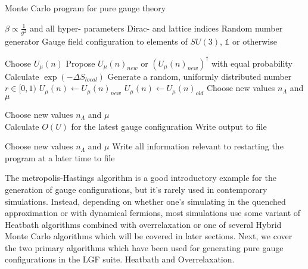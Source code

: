 \documentclass[a4paper,10pt]{book}
\begin{document}
\begin{algorithm}
\caption{Monte Carlo program for pure gauge theory}\label{alg:cap}
\begin{algorithmic}

\Ensure 
\State $\beta \propto \frac{1}{g^2}$ and all hyper- parameters
\State Dirac- and lattice indices
\State Random number generator 
\State Gauge field configuration to elements of $SU(3)$, $\mathbb{1}$ or otherwise

\State Choose $U_\mu(n)$
\State Propose $U_\mu(n)_{new}$ or $(U_\mu(n)_{new})^\dagger$ with equal probability
\State Calculate $\exp (-\Delta S_{local})$
\State Generate a random, uniformly distributed number $r \in [0,1) $
    \State $U_\mu(n) \gets U_\mu(n)_{new}$
\Else
    \State $U_\mu(n) \gets U_\mu(n)_{old}$
\EndIf
\EndFunction
\State Choose new values $n_\Lambda$ and $\mu$
\EndWhile



\State Choose new values $n_\Lambda$ and $\mu$
\EndFunction
\EndWhile\\

\State Calculate $O(U)$ for the latest gauge configuration
\State Write output to file 

\EndFunction
\State Choose new values $n_\Lambda$ and $\mu$
\EndWhile
\State Write all information relevant to restarting the program at a later time to file 
\end{algorithmic}
\end{algorithm}
The metropolis-Hastings algorithm is a good introductory example for the generation of gauge configurations, but it's rarely used in contemporary simulations. Instead, depending on whether one's simulating in the quenched approximation or with dynamical fermions, most simulations use some variant of Heatbath algorithms combined with overrelaxation or one of several Hybrid Monte Carlo algorithms which will be covered in later sections. Next, we cover the two primary algorithms which have been used for generating pure gauge configurations in the LGF suite. Heatbath and Overrelaxation.
\end{document}
